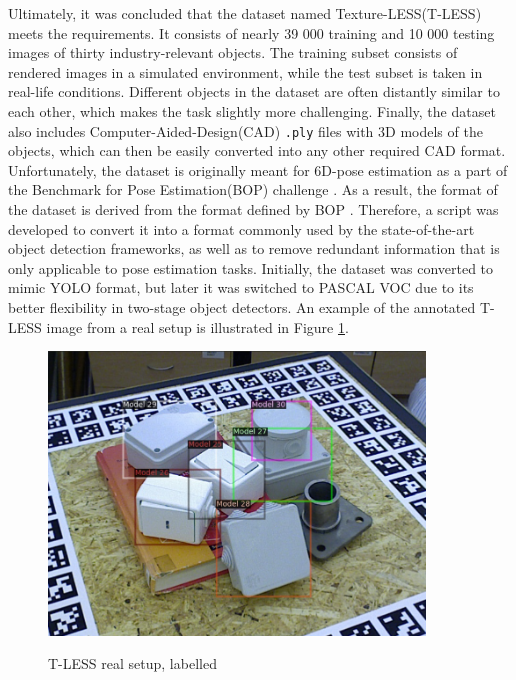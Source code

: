 \documentclass[english, 12pt, a4paper, elec, utf8, a-1b, online]{aaltothesis}
\begin{document}
Ultimately, it was concluded that the dataset named Texture-LESS(T-LESS) \cite{hodan2017tless} meets the requirements. It consists of nearly 39 000 training and 10 000 testing images of thirty industry-relevant objects. The training subset consists of rendered images in a simulated environment, while the test subset is taken in real-life conditions.  Different objects in the dataset are often distantly similar to each other, which makes the task slightly more challenging. Finally, the dataset also includes Computer-Aided-Design(CAD) \texttt{.ply} files with 3D models of the objects, which can then be easily converted into any other required CAD format. Unfortunately, the dataset is originally meant for 6D-pose estimation \cite{hodan2017tless} as a part of the Benchmark for Pose Estimation(BOP) challenge \cite{hodan2018bop}. As a result, the format of the dataset is derived from the format defined by BOP \cite{hodan2018bop_format}. Therefore, a script was developed to convert it into a format commonly used by the state-of-the-art object detection frameworks, as well as to remove redundant information that is only applicable to pose estimation tasks. Initially, the dataset was converted to mimic YOLO \cite{Redmon2015a} format, but later it was switched to PASCAL VOC due to its better flexibility in two-stage object detectors. An example of the annotated T-LESS image from a real setup is illustrated in Figure \ref{tless_real_example}. 

\begin{figure}[htb]
	\begin{center}
		\includegraphics[width=10cm]{./tless_real_annotated.png}
	\end{center}
	\caption{T-LESS real setup, labelled
\cite{hodan2017tless}}
	\begin{center}
		\label{tless_real_example}
	\end{center}
\end{figure}
\FloatBarrier
\end{document}
